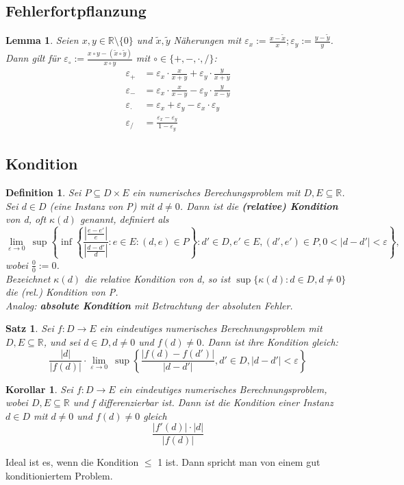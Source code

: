 \documentclass[12pt,a4paper]{article}
\theoremstyle{plain}
\newtheorem{Satz}[Theorem]{Satz}
\newtheorem{Lemma}[Theorem]{Lemma}
\newtheorem{Korollar}[Theorem]{Korollar}
\newtheorem{Definition}[Theorem]{Definition}
\newcommand{\herv}[1]{{\emph{\textbf{#1}}}}
\newcommand{\R}{\mathbb{R}}
\numberwithin{equation}{section}
\begin{document}
\subsection{Fehlerfortpflanzung}
\begin{Lemma}
Seien $x,y \in \R\setminus\{0\}$ und $\tilde x, \tilde y$ Näherungen mit $\varepsilon_x:=\frac{x-\tilde x}{x}; \varepsilon_y:=\frac{y-\tilde y}{y}$. Dann gilt für $\varepsilon_{\circ}:=\frac{x\circ y-\left(\tilde x \circ \tilde y\right)}{x\circ y}$ mit $\circ \in \{+,-,\cdot,/\}$:
\begin{align*}
\varepsilon_+&=\varepsilon_x\cdot\frac{x}{x+y}+\varepsilon_y\cdot\frac{y}{x+y} \\
\varepsilon_-&=\varepsilon_x\cdot\frac{x}{x-y}-\varepsilon_y\cdot\frac{y}{x-y} \\
\varepsilon_{\cdot}&=\varepsilon_x+\varepsilon_y-\varepsilon_x\cdot \varepsilon_y \\
\varepsilon_/&=\frac{\varepsilon_x-\varepsilon_y}{1-\varepsilon_y}
\end{align*}
\end{Lemma}
\subsection{Kondition}
\begin{Definition}
Sei $P\subseteq D\times E$ ein numerisches Berechungsproblem mit $D,E \subseteq \R$. Sei $d\in D$ (eine Instanz von P) mit $d\neq 0$. Dann ist die \herv{(relative) Kondition} von d, oft $\kappa(d)$ genannt, definiert als
\[ \lim_{\varepsilon \rightarrow 0}\ \sup \left\lbrace\inf \left\lbrace \frac{\left|\frac{e-e'}{e}\right|}{\left|\frac{d-d'}{d}\right|}:e\in E:(d,e)\in P \right\rbrace : d'\in D, e'\in E, (d',e')\in P, 0<|d-d'|<\varepsilon \right\rbrace ,
\]
wobei $\frac{0}{0}:=0$.\\
Bezeichnet $\kappa(d)$ die relative Kondition von d, so ist $\sup \{\kappa(d):d\in D, d\neq 0\}$ die (rel.) Kondition von P.\\
Analog: \herv{absolute Kondition} mit Betrachtung der absoluten Fehler.
\end{Definition}
\begin{Satz}
Sei $f: D\rightarrow E$ ein eindeutiges numerisches Berechnungsproblem mit $D,E \subseteq \R$, und sei $d\in D, d\neq 0$ und $f(d)\neq 0$. Dann ist ihre Kondition gleich:
\[ \frac{|d|}{|f(d)|}\cdot \lim_{\varepsilon \rightarrow 0}\ \sup \left\lbrace\frac{|f(d)-f(d')|}{|d-d'|},d' \in D, |d-d'|<\varepsilon \right\rbrace
\]
\end{Satz}
\begin{Korollar}
Sei $f:D \rightarrow E$ ein eindeutiges numerisches Berechnungsproblem, wobei $D,E\subseteq \R$ und f differenzierbar ist. Dann ist die Kondition einer Instanz $d\in D$ mit $d\neq 0$ und $f(d)\neq 0$ gleich\\
\[
\frac{|f'(d)|\cdot |d|}{|f(d)|}
\]
\end{Korollar}
Ideal ist es, wenn die Kondition $\leq$ 1 ist. Dann spricht man von einem \glqq gut konditioniertem Problem\grqq.
\end{document}
